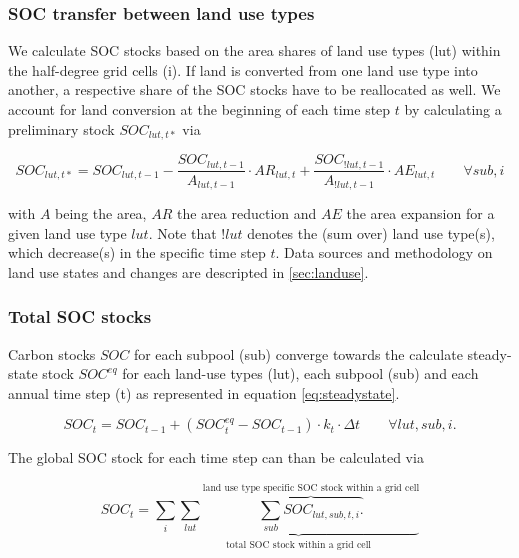 \documentclass[gc, manuscript]{copernicus}
\begin{document}
\hypertarget{soc-transfer-between-land-use-types}{%
\subsubsection{SOC transfer between land use types}\label{soc-transfer-between-land-use-types}}

We calculate SOC stocks based on the area shares of land use types (lut) within the half-degree grid cells (i). If land is converted from one land use type into another, a respective share of the SOC stocks have to be reallocated as well. We account for land conversion at the beginning of each time step \(t\) by calculating a preliminary stock \(SOC_{lut,t*}\) via

\begin{equation}
SOC_{lut,t*} = SOC_{lut,t-1} - \frac{SOC_{lut,t-1}}{A_{lut,t-1}} \cdot  AR_{lut,t} + \frac{SOC_{!lut,t-1}}{A_{!lut,t-1}} \cdot  AE_{lut,t} \qquad \forall sub, i  
\label{eq:ctransfer}
\end{equation}

with \(A\) being the area, \(AR\) the area reduction and \(AE\) the area expansion for a given land use type \(lut\). Note that \(!lut\) denotes the (sum over) land use type(s), which decrease(s) in the specific time step \(t\). Data sources and methodology on land use states and changes are descripted in \ref{sec:landuse}.

\hypertarget{total-soc-stocks}{%
\subsubsection{Total SOC stocks}\label{total-soc-stocks}}

Carbon stocks \(SOC\) for each subpool (sub) converge towards the calculate steady-state stock \(SOC^{eq}\) for each land-use types (lut), each subpool (sub) and each annual time step (t) as represented in equation \eqref{eq:steadystate}.

\begin{equation}
SOC_{t} = SOC_{t-1} + (SOC^{eq}_{t} - SOC_{t-1}) \cdot k_{t} \cdot \Delta t \qquad \forall lut, sub, i.
\label{eq:steadystate}
\end{equation}

The global SOC stock for each time step can than be calculated via

\begin{equation}
SOC_{t} = \sum_{i} \underbrace{\sum_{lut} \overbrace{\sum_{sub} SOC_{lut, sub, t, i}.}^{\text{land use type specific SOC stock within a grid cell}}}_{\text{total SOC stock within a grid cell}}
\label{eq:totalstock}
\end{equation}
\end{document}
